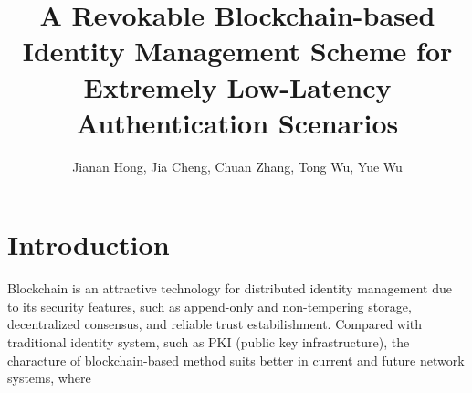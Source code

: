\documentclass{IEEEconf}
\title{A Revokable Blockchain-based Identity Management Scheme for Extremely Low-Latency Authentication Scenarios}
\author{Jianan Hong, Jia Cheng, Chuan Zhang, Tong Wu, Yue Wu}
\begin{document}
\maketitle

\section{Introduction}
Blockchain is an attractive technology for distributed identity management due to its security features, such as append-only and non-tempering storage, decentralized consensus, and reliable trust estabilishment. Compared with traditional identity system, such as PKI (public key infrastructure), the characture of blockchain-based method suits better in current and future network systems, where
\end{document}
